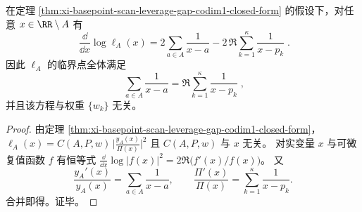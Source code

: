 \begin{corollary}\label{cor:xi-basepoint-scan-leverage-gap-codim1-critical-points}
在定理 \ref{thm:xi-basepoint-scan-leverage-gap-codim1-closed-form} 的假设下，对任意 \(x\in\RR\setminus A\) 有
\[
\boxed{\;
\frac{\dd}{\dd x}\log \ell_A(x)
=
2\sum_{a\in A}\frac{1}{x-a}
-2\,\Re\sum_{k=1}^{\kappa}\frac{1}{x-p_k}\; }.
\]
因此 \(\ell_A\) 的临界点全体满足
\[
\boxed{\;
\sum_{a\in A}\frac{1}{x-a}
=
\Re\sum_{k=1}^{\kappa}\frac{1}{x-p_k}\; },
\]
并且该方程与权重 \(\{w_k\}\) 无关。
\end{corollary}
\begin{proof}
由定理 \ref{thm:xi-basepoint-scan-leverage-gap-codim1-closed-form}，
\(
\ell_A(x)=C(A,P,w)\,\bigl|\frac{y_A(x)}{\Pi(x)}\bigr|^2
\)
且 \(C(A,P,w)\) 与 \(x\) 无关。
对实变量 \(x\) 与可微复值函数 \(f\) 有恒等式
\(
\frac{\dd}{\dd x}\log|f(x)|^2=2\Re\bigl(f'(x)/f(x)\bigr)
\)。
又
\[
\frac{y_A'(x)}{y_A(x)}=\sum_{a\in A}\frac{1}{x-a},
\qquad
\frac{\Pi'(x)}{\Pi(x)}=\sum_{k=1}^{\kappa}\frac{1}{x-p_k}.
\]
合并即得。证毕。
\end{proof}

